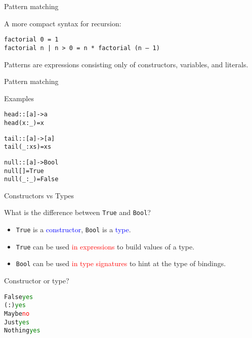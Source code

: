 \documentclass{beamer}
\def\code#1{\texttt{\frenchspacing#1}}
\begin{document}
\begin{frame}[fragile]{Pattern matching}

A more compact syntax for recursion:

\begin{verbatim}
factorial 0 = 1
factorial n | n > 0 = n * factorial (n – 1)
\end{verbatim}

\pause

\begin{block}{\centering Patterns are expressions consisting only of constructors,  variables, and literals.}
\end{block}

\end{frame}

\begin{frame}[fragile]{Pattern matching}

\begin{exampleblock}{Examples}
\begin{alltt}
head :: [a] -> a\pause
head (x : _) = x

tail :: [a] -> [a]\pause
tail (_ : xs) = xs

null :: [a] -> Bool\pause
null []      = True
null (_ : _) = False
\end{alltt}
\end{exampleblock}

\end{frame}

\begin{frame}[fragile]{Constructors vs Types}

What is the difference between \code{True} and \code{Bool}?

\begin{itemize}
    \item \code{True} is a \textcolor{blue}{constructor}, \code{Bool} is a \textcolor{blue}{type}.
    \item \code{True} can be used \textcolor{red}{in expressions} to build values of a type.
    \item \code{Bool} can be used \textcolor{red}{in type signatures} to hint at the type of bindings.
\end{itemize}

\pause

\vspace{1cm}
Constructor or type?
\begin{alltt}
False\pause    \textcolor{green}{yes}
(:)\pause      \textcolor{green}{yes}
Maybe\pause    \textcolor{red}{no}
Just\pause     \textcolor{green}{yes}
Nothing  \textcolor{green}{yes}
\end{alltt}

\end{frame}
\end{document}
